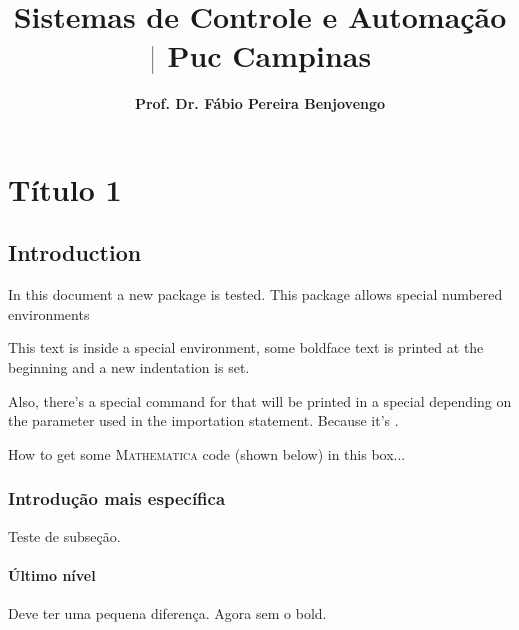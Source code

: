 \documentclass{book}
\title{\bfseries\textcolor{textgray}{Sistemas de Controle e Automação} \textcolor{gray}{$|$} \textcolor{MyDarkYellow}{Puc Campinas}}
\author{\bfseries Prof. Dr. Fábio Pereira Benjovengo}
\begin{document}
\frontmatter

\maketitle %
\tableofcontents %
\listoffigures %

\mainmatter
\chapter{Título 1}
\section{Introduction}
In this document a new package is tested. This package allows special numbered environments

\begin{example}
This text is inside a special environment, some boldface text is printed
at the beginning and a new indentation is set.
\end{example}

Also, there's a special command for  that will be printed in a special  depending on the parameter used in the  importation statement. Because it's .

\begin{warning}
How to get some \textsc{Mathematica} code (shown below) in this box...\\
\lipsum[1][1]
\end{warning}

\subsection{Introdução mais específica}

Teste de subseção.

\subsubsection{Último nível}

Deve ter uma pequena diferença. Agora sem o bold.

\printindex
\end{document}
